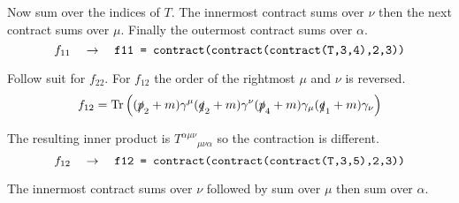 \documentclass[12pt]{article}
\begin{document}
Now sum over the indices of $T$.
The innermost contract sums over $\nu$ then the next contract sums over $\mu$.
Finally the outermost contract sums over $\alpha$.
\begin{equation*}
f_{11}\quad\rightarrow\quad
\text{\tt f11 = contract(contract(contract(T,3,4),2,3))}
\end{equation*}

Follow suit for $f_{22}$.
For $f_{12}$ the order of the rightmost $\mu$ and $\nu$ is reversed.
\begin{equation*}
f_{12}=\mathop{\rm Tr}
\left(
(\slashed{p}_2+m)\gamma^\mu(\slashed{q}_2+m)\gamma^\nu(\slashed{p}_4+m)\gamma_\mu(\slashed{q}_1+m)\gamma_\nu
\right)
\end{equation*}

The resulting inner product is $T^{\alpha\mu\nu}{}_{\mu\nu\alpha}$
so the contraction is different.
\begin{equation*}
f_{12}
\quad\rightarrow\quad
\text{\tt f12 = contract(contract(contract(T,3,5),2,3))}
\end{equation*}

The innermost contract sums over $\nu$ followed by sum over $\mu$ then sum over $\alpha$.
\end{document}
